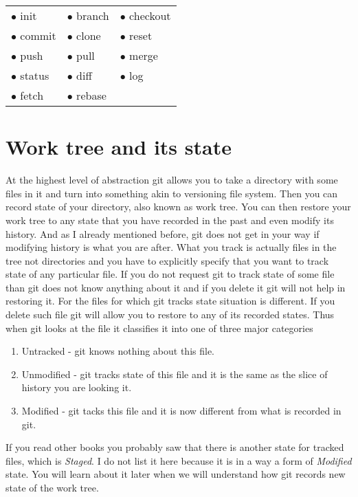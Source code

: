 \documentclass{article}
\theoremstyle{definition}
\begin{document}
        \begin{center}
        \begin{tabular}{ l l l }
        $\bullet$ init & $\bullet$ branch & $\bullet$ checkout \\
        $\bullet$ commit & $\bullet$ clone & $\bullet$ reset \\
        $\bullet$ push & $\bullet$ pull & $\bullet$ merge \\
        $\bullet$ status & $\bullet$ diff & $\bullet$ log \\
        $\bullet$ fetch & $\bullet$ rebase
        \end{tabular}
        \end{center}

        \newpage
        \section{Work tree and its state}
        At the highest level of abstraction git allows you to take a directory with some files in it and turn into
        something akin to versioning file system. Then you can record state of your directory, also known as work tree.
        You can then restore your work tree to any state that you have recorded in the past and even modify its
        history. And as I already mentioned before, git does not get in your way if modifying history is what you are
        after. What you track is actually files in the tree not directories and you have to explicitly specify that you
        want to track state of any particular file. If you do not request git to track state of some file than git does
        not know anything about it and if you delete it git will not help in restoring it. For the files for which git
        tracks state situation is different. If you delete such file git will allow you to restore to any of its
        recorded states. Thus when git looks at the file it classifies it into one of three major categories
        \begin{enumerate}
                \item Untracked - git knows nothing about this file.
                \item Unmodified - git tracks state of this file and it is the same as the slice of history you are looking it.
                \item Modified - git tacks this file and it is now different from what is recorded in git.
        \end{enumerate}
        If you read other books you probably saw that there is another state for tracked files, which is {\em Staged}.
        I do not list it here because it is in a way a form of {\em Modified} state. You will learn about it later when
        we will understand how git records new state of the work tree.
\end{document}
